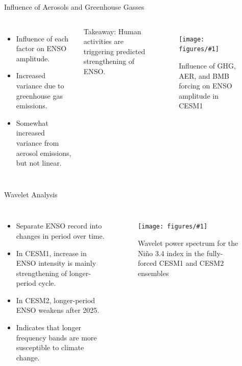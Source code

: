 \documentclass{beamer}
\newcommand{\myfig}[3]{
  \begin{figure}
    \centering
    \texttt{[image: figures/\#1]}
    \caption{#2}
    \label{fig:#3}
  \end{figure}
}
\begin{document}
\begin{frame}{Influence of Aerosols and Greenhouse Gasses}
  \begin{columns}
    \begin{itemize}
    \item Influence of each factor on ENSO amplitude.
    \item Increased variance due to greenhouse gas emissions.
    \item Somewhat increased variance from aerosol emissions, but not linear.
    \end{itemize}
    \alert{Takeaway:} Human activities are triggering predicted strengthening of ENSO.
    \myfig{cesm1_sf_4.pdf}{Influence of GHG, AER, and BMB forcing on ENSO amplitude in CESM1}{cesm1_sf_4}
  \end{columns}
\end{frame}


\begin{frame}{Wavelet Analysis}
  \begin{columns}
    \begin{itemize}
    \item Separate ENSO record into changes in period over time.
    \item In CESM1, increase in ENSO intensity is mainly strengthening of longer-period cycle.
    \item In CESM2, longer-period ENSO weakens after 2025.
    \item Indicates that longer frequency bands are more susceptible to climate change.
    \end{itemize}
    \myfig{wavelet3.pdf}{Wavelet power spectrum for the Niño 3.4 index in the fully-forced CESM1 and CESM2 ensembles}{wavelet2}
  \end{columns}
\end{frame}
\end{document}
